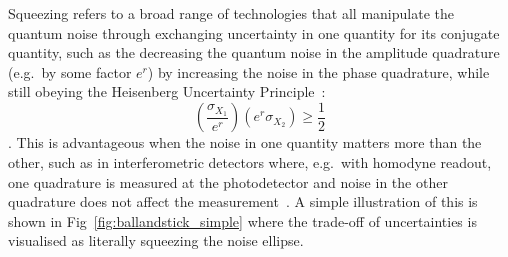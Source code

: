 Squeezing refers to a broad range of technologies that all manipulate the quantum noise through exchanging uncertainty in one quantity for its conjugate quantity, such as the decreasing the quantum noise in the amplitude quadrature (e.g.\ by some factor $e^r$) by increasing the noise in the phase quadrature, while still obeying the Heisenberg Uncertainty Principle~\cite{}: $$(\frac{\sigma_{X_1}}{e^r}) (e^r\sigma_{X_2})\geq\frac{1}{2}$$. This is advantageous when the noise in one quantity matters more than the other, such as in interferometric detectors where, e.g.\ with homodyne readout, one quadrature is measured at the photodetector and noise in the other quadrature does not affect the measurement~\cite{}. A simple illustration of this is shown in Fig~\ref{fig:ballandstick_simple} where the trade-off of uncertainties is visualised as literally squeezing the noise ellipse.











